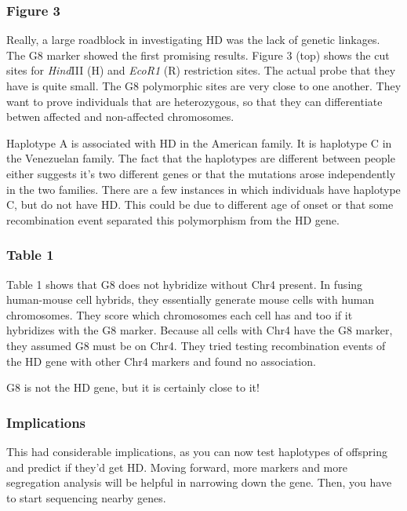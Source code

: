 \documentclass[12pt]{report}
\begin{document}
\subsubsection{Figure 3}

Really, a large roadblock in investigating HD was the lack of genetic linkages. The G8 marker showed the first promising results. Figure 3 (top) shows the cut sites for \textit{Hind}III (H) and \textit{EcoR1} (R) restriction sites. The actual probe that they have is quite small. The G8 polymorphic sites are very close to one another. They want to prove individuals that are heterozygous, so that they can differentiate betwen affected and non-affected chromosomes.\newline

Haplotype A is associated with HD in the American family. It is haplotype C in the Venezuelan family. The fact that the haplotypes are different between people either suggests it's two different genes or that the mutations arose independently in the two families. There are a few instances in which individuals have haplotype C, but do not have HD. This could be due to different age of onset or that some recombination event separated this polymorphism from the HD gene.\newline


\subsubsection{Table 1}

Table 1 shows that G8 does not hybridize without Chr4 present. 
In fusing human-mouse cell hybrids, they essentially generate mouse cells with human chromosomes. They score which chromosomes each cell has and too if it hybridizes with the G8 marker. Because all cells with Chr4 have the G8 marker, they assumed G8 must be on Chr4. They tried testing recombination events of the HD gene with other Chr4 markers and found no association.\newline

G8 is not the HD gene, but it is certainly close to it! 

\subsubsection{Implications} 

This had considerable implications, as you can now test haplotypes of offspring and predict if they'd get HD. Moving forward, more markers and more segregation analysis will be helpful in narrowing down the gene. Then, you have to start sequencing nearby genes.  
\end{document}
